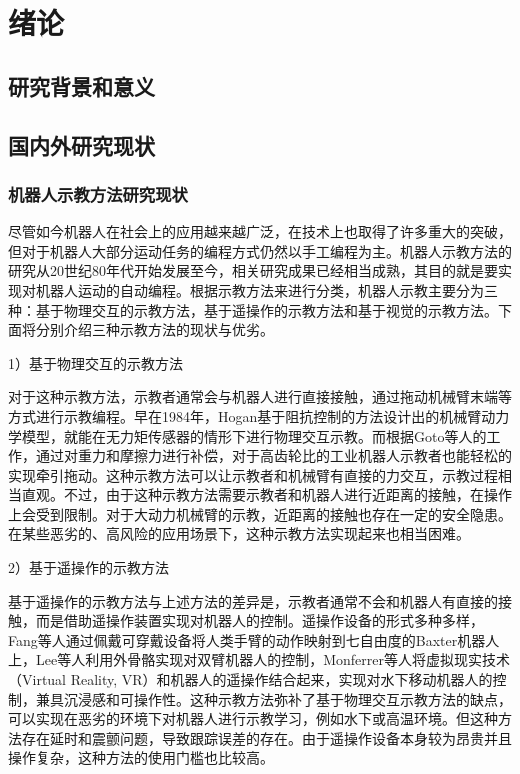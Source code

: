 \chapter{绪论}
\section{研究背景和意义}





\section{国内外研究现状}
\subsection{机器人示教方法研究现状}
尽管如今机器人在社会上的应用越来越广泛，在技术上也取得了许多重大的突破，但对于机器人大部分运动任务的编程方式仍然以手工编程为主。机器人示教方法的研究从20世纪80年代开始发展至今，相关研究成果已经相当成熟，其目的就是要实现对机器人运动的自动编程\cite{Chen2020}。根据示教方法来进行分类，机器人示教主要分为三种：基于物理交互的示教方法，基于遥操作的示教方法和基于视觉的示教方法\cite{Zeng2019}。下面将分别介绍三种示教方法的现状与优劣。

1）基于物理交互的示教方法

对于这种示教方法，示教者通常会与机器人进行直接接触，通过拖动机械臂末端等方式进行示教编程。早在1984年，Hogan基于阻抗控制的方法设计出的机械臂动力学模型，就能在无力矩传感器的情形下进行物理交互示教\cite{Hogan1984a}。而根据Goto等人的工作，通过对重力和摩擦力进行补偿，对于高齿轮比的工业机器人示教者也能轻松的实现牵引拖动\cite{Goto2002}。这种示教方法可以让示教者和机械臂有直接的力交互，示教过程相当直观。不过，由于这种示教方法需要示教者和机器人进行近距离的接触，在操作上会受到限制\cite{Zeng2019}。对于大动力机械臂的示教，近距离的接触也存在一定的安全隐患\cite{Li2021}。在某些恶劣的、高风险的应用场景下，这种示教方法实现起来也相当困难。

2）基于遥操作的示教方法

基于遥操作的示教方法与上述方法的差异是，示教者通常不会和机器人有直接的接触，而是借助遥操作装置实现对机器人的控制。遥操作设备的形式多种多样，Fang等人通过佩戴可穿戴设备将人类手臂的动作映射到七自由度的Baxter机器人上\cite{Fang2019a}，Lee等人利用外骨骼实现对双臂机器人的控制\cite{Lee2014}，Monferrer等人将虚拟现实技术（Virtual Reality, VR）和机器人的遥操作结合起来，实现对水下移动机器人的控制，兼具沉浸感和可操作性\cite{Monferrer2002}。这种示教方法弥补了基于物理交互示教方法的缺点，可以实现在恶劣的环境下对机器人进行示教学习，例如水下或高温环境。但这种方法存在延时和震颤问题\cite{Yang2017}，导致跟踪误差的存在。由于遥操作设备本身较为昂贵并且操作复杂，这种方法的使用门槛也比较高\cite{Li2022}。


